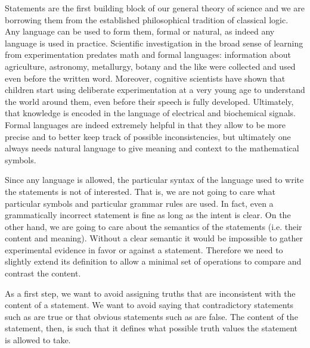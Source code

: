 \documentclass[11pt,letterpaper,fleqn]{memoir} %
\begin{document}
Statements are the first building block of our general theory of science and we are borrowing them from the established philosophical tradition of classical logic. Any language can be used to form them, formal or natural, as indeed any language is used in practice. Scientific investigation in the broad sense of learning from experimentation predates math and formal languages: information about agriculture, astronomy, metallurgy, botany and the like were collected and used even before the written word. Moreover, cognitive scientists have shown that children start using deliberate experimentation at a very young age to understand the world around them, even before their speech is fully developed. Ultimately, that knowledge is encoded in the language of electrical and biochemical signals. Formal languages are indeed extremely helpful in that they allow to be more precise and to better keep track of possible inconsistencies, but ultimately one always needs natural language to give meaning and context to the mathematical symbols. 

Since any language is allowed, the particular syntax of the language used to write the statements is not of interested. That is, we are not going to care what particular symbols and particular grammar rules are used. In fact, even a grammatically incorrect statement is fine as long as the intent is clear. On the other hand, we are going to care about the semantics of the statements (i.e. their content and meaning). Without a clear semantic it would be impossible to gather experimental evidence in favor or against a statement. Therefore we need to slightly extend its definition to allow a minimal set of operations to compare and contrast the content.

As a first step, we want to avoid assigning truths that are inconsistent with the content of a statement.  We want to avoid saying that contradictory statements such as  are true or that obvious statements such as  are false. The content of the statement, then, is such that it defines what possible truth values the statement is allowed to take.
\end{document}
